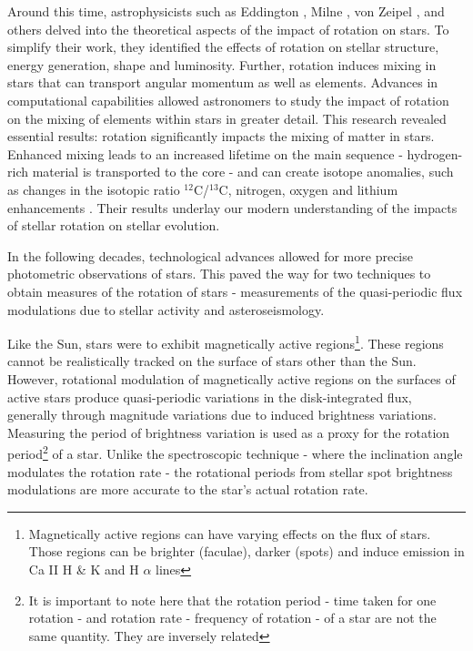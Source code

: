 Around this time, astrophysicists such as Eddington \citep{eddington_conditions_1918,eddington_internal_1926,eddington_internal_1929}, Milne \citep{milne_equilibrium_1923}, von Zeipel \citep{von_zeipel_radiative_1924}, and others delved into the theoretical aspects of the impact of rotation on stars.
To simplify their work, they identified the effects of rotation on stellar structure, energy generation, shape and luminosity. 
Further, rotation induces mixing in stars that can transport angular momentum as well as elements.
Advances in computational capabilities allowed astronomers to study the impact of rotation on the mixing of elements within stars in greater detail. 
This research revealed essential results: rotation significantly impacts the mixing of matter in stars. 
Enhanced mixing leads to an increased lifetime on the main sequence - hydrogen-rich material is transported to the core - and can create isotope anomalies, such as changes in the isotopic ratio $^{12}$C/$^{13}$C, nitrogen, oxygen and lithium enhancements \citep{maeder_evolution_2000,heger_presupernova_2000,charbonnel_lithium_1994}.
Their results underlay our modern understanding of the impacts of stellar rotation on stellar evolution.

In the following decades, technological advances allowed for more precise photometric observations of stars. This paved the way for two techniques to obtain measures of the rotation of stars - measurements of the quasi-periodic flux modulations due to stellar activity and asteroseismology.

Like the Sun, stars were to exhibit magnetically active regions\footnote{Magnetically active regions can have varying effects on the flux of stars. Those regions can be brighter (faculae), darker (spots) and induce emission in Ca II H \& K and H $\alpha$ lines}. 
These regions cannot be realistically tracked on the surface of stars other than the Sun. 
However, rotational modulation of magnetically active regions on the surfaces of active stars produce quasi-periodic variations in the disk-integrated flux, generally through magnitude variations due to induced brightness variations.
Measuring the period of brightness variation is used as a proxy for the rotation period\footnote{It is important to note here that the rotation period - time taken for one rotation -  and rotation rate - frequency of rotation - of a star are not the same quantity. They are inversely related} of a star.
Unlike the spectroscopic technique - where the inclination angle modulates the rotation rate  - the rotational periods from stellar spot brightness modulations are more accurate to the star's actual rotation rate.

